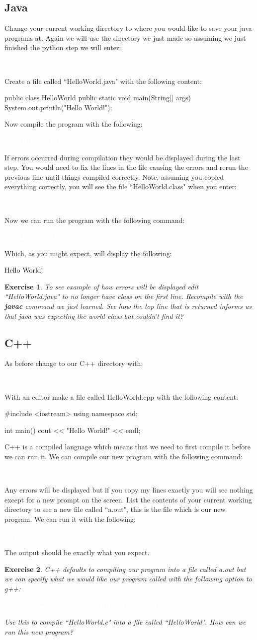 \documentclass[oneside]{book}
\newcommand{\commandline}[1]{\begin{center} \colorbox{Dark}{\textcolor{white}{#1}} \end{center}}
\newcommand{\exampleout}[1]{\begin{center} \colorbox{Light}{\textcolor{black}{#1}} \end{center}}
\newtheorem{ex}{Exercise}[chapter]
\begin{document}
\subsection{Java}
Change your current working directory to where you would like to save your java programs at. Again we will use the directory we just made so assuming we just finished the python step we will enter:
\commandline{cd ../Java}
Create a file called ``HelloWorld.java" with the following content:
\begin{verbatimtab}
    public class HelloWorld {
        public static void main(String[] args) {
            System.out.println("Hello World!");
        }
    }
\end{verbatimtab}
Now compile the program with the following:
\commandline{javac HelloWorld.java}
If errors occurred during compilation they would be displayed during the last step. You would need to fix the lines in the file causing the errors and rerun the previous line until things compiled correctly. Note, assuming you copied everything correctly, you will see the file ``HelloWorld.class" when you enter:
\commandline{ls}
Now we can run the program with the following command:
\commandline{java HelloWorld}
Which, as you might expect, will display the following:
\exampleout{Hello World!}
\begin{ex}
    To see example of how errors will be displayed edit ``HelloWorld.java" to no longer have class on the first line. Recompile with the \textbf{javac} command we just learned. See how the top line that is returned informs us that java was expecting the world class but couldn't find it?
\end{ex}

\subsection{C++}
As before change to our C++ directory with:
\commandline{cd ../C++}
With an editor make a file called HelloWorld.cpp with the following content:
\begin{verbatimtab}
    #include <iostream>
    using namespace std;
    
    int main() {
        cout << "Hello World!" << endl;
    }
\end{verbatimtab}
C++ is a compiled language which means that we need to first compile it before we can run it. We can compile our new program with the following command:
\commandline{g++ HelloWorld.cpp}
Any errors will be displayed but if you copy my lines exactly you will see nothing except for a new prompt on the screen. List the contents of your current working directory to see a new file called ``a.out", this is the file which is our new program. We can run it with the following:
\commandline{./a.out}
The output should be exactly what you expect. 
\begin{ex}
    C++ defaults to compiling our program into a file called a.out but we can specify what we would like our program called with the following option to g++:
    \commandline{g++ ourprogramfile.cpp -o whatIWantMyProgramToBeCalled}
    Use this to compile ``HelloWorld.c" into a file called ``HelloWorld". How can we run this new program?
\end{ex}
\end{document}
